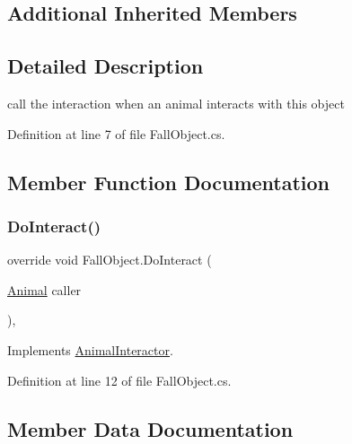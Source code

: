 \subsection*{Additional Inherited Members}


\subsection{Detailed Description}
call the interaction when an animal interacts with this object 



Definition at line 7 of file Fall\+Object.\+cs.



\subsection{Member Function Documentation}
\mbox{\label{class_fall_object_a5d796a5c10e490ce3bb5356b49eaae29}} 
\subsubsection{\texorpdfstring{Do\+Interact()}{DoInteract()}}
{\footnotesize\ttfamily override void Fall\+Object.\+Do\+Interact (\begin{DoxyParamCaption}\item[{\mbox{\hyperlink{class_animal}{Animal}}}]{caller }\end{DoxyParamCaption})\hspace{0.3cm}{\ttfamily [protected]}, {\ttfamily [virtual]}}



Implements \mbox{\hyperlink{class_animal_interactor_a522811ab410a5acbc12362e29263c5a8}{Animal\+Interactor}}.



Definition at line 12 of file Fall\+Object.\+cs.



\subsection{Member Data Documentation}
\mbox{\label{class_fall_object_ad3d5a0a0b2bf15fd9ad12a4b0acc4c8f}} 
